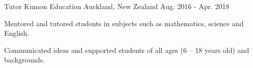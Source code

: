 \begin{cventries}
  \cventry
    {Tutor} %
    {Kumon Education} %
    {Auckland, New Zealand} %
    {Aug. 2016 - Apr. 2018} %
    {
      \begin{cvitems} %
        \item {Mentored and tutored students in subjects such as mathematics, science and English.}
        \item {Communicated ideas and supported students of all ages (6 – 18 years old) and backgrounds.}
      \end{cvitems}
    }
\end{cventries}
